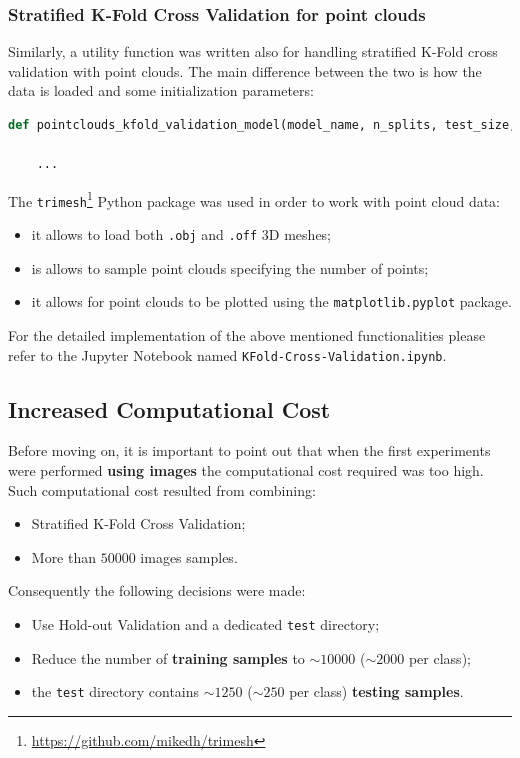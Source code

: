 \documentclass[11pt,a4paper]{article}
\begin{document}
\subsubsection{Stratified K-Fold Cross Validation for point clouds}
Similarly, a utility function was written also for handling stratified K-Fold cross validation with point clouds. The main difference between the two is how the data is loaded and some initialization parameters:
\begin{lstlisting}[language=Python,frame=single,caption={Definition of the function used to perform stratified K-Fold cross validation with point clouds data.},captionpos=b]
    def pointclouds_kfold_validation_model(model_name, n_splits, test_size, shuffle, model, learning_rate, decay, target_size, epochs, batch_size, one_fold=True, resample_data=0, augment=False):

    ...
\end{lstlisting}
The \texttt{trimesh}\footnote{\url{https://github.com/mikedh/trimesh}} Python package was used in order to work with point cloud data:
\begin{itemize}
    \item it allows to load both \texttt{.obj} and \texttt{.off} 3D meshes;
    \item is allows to sample point clouds specifying the number of points;
    \item it allows for point clouds to be plotted using the \texttt{matplotlib.pyplot} package.
\end{itemize}
For the detailed implementation of the above mentioned functionalities please refer to the Jupyter Notebook named \texttt{KFold-Cross-Validation.ipynb}.
\subsection{Increased Computational Cost}
Before moving on, it is important to point out that when the first experiments were performed \textbf{using images} the computational cost required was too high. Such computational cost resulted from combining:
\begin{itemize}
    \item Stratified K-Fold Cross Validation;
    \item More than $50000$ images samples.
\end{itemize}
Consequently the following decisions were made:
\begin{itemize}
    \item Use Hold-out Validation and a dedicated \texttt{test} directory;
    \item Reduce the number of \textbf{training samples} to $\sim 10000$ ($\sim 2000$ per class);
    \item the \texttt{test} directory contains $\sim 1250$ ($\sim 250$ per class) \textbf{testing samples}.
\end{itemize}
\end{document}
